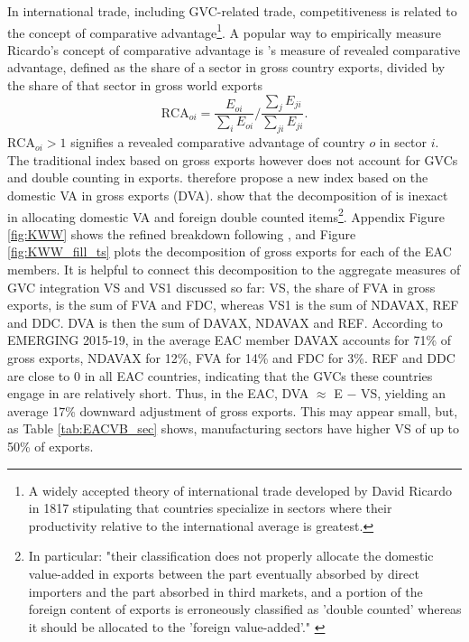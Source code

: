 \documentclass[a4paper]{article}
\begin{document}
In international trade, including GVC-related trade, competitiveness is related to the concept of comparative advantage\footnote{A widely accepted theory of international trade developed by David Ricardo in 1817 stipulating that countries specialize in sectors where their productivity relative to the international average is greatest.}. 
A popular way to empirically measure Ricardo's concept of comparative advantage is \citet{balassa1965trade}'s measure of revealed comparative advantage, defined as the share of a sector in gross country exports, divided by the share of that sector in gross world exports
\begin{equation}
\text{RCA}_{oi} = \frac{E_{oi}}{\sum_i E_{oi}} \Bigg/ \frac{\sum_j E_{ji}}{\sum_{ji} E_{ji}}.
\end{equation}
$\text{RCA}_{oi}>1$ signifies a revealed comparative advantage of country $o$ in sector $i$. The traditional index based on gross exports however does not account for GVCs and double counting in exports. \citet{koopman2014tracing} therefore propose a new index based on the domestic VA in gross exports (DVA). \citet{borin2019measuring} show that the decomposition of \citet{koopman2014tracing} is inexact in allocating domestic VA and foreign double counted items\footnote{In particular: "their classification does not properly allocate the domestic value-added in exports between the part eventually absorbed by direct importers and the part absorbed in third markets, and  a portion of the foreign content of exports is erroneously classified as 'double counted' whereas it should be allocated to the 'foreign value-added'." \citep{borin2019measuring}}. Appendix Figure \ref{fig:KWW} shows the refined breakdown following \citet{borin2019measuring}, and Figure \ref{fig:KWW_fill_ts} plots the decomposition of gross exports for each of the EAC members. It is helpful to connect this decomposition to the aggregate measures of GVC integration VS and VS1 discussed so far: VS, the share of FVA in gross exports, is the sum of FVA and FDC, whereas VS1 is the sum of NDAVAX, REF and DDC. DVA is then the sum of DAVAX, NDAVAX and REF. According to EMERGING 2015-19, in the average EAC member DAVAX accounts for 71\% of gross exports, NDAVAX for 12\%, FVA for 14\% and FDC for 3\%. REF and DDC are close to 0 in all EAC countries, indicating that the GVCs these countries engage in are relatively short. Thus, in the EAC, DVA $\approx$ E $-$ VS, yielding an average 17\% downward adjustment of gross exports. This may appear small, but, as Table \ref{tab:EACVB_sec} shows, manufacturing sectors have higher VS of up to 50\% of exports. \newline
 
\end{document}
